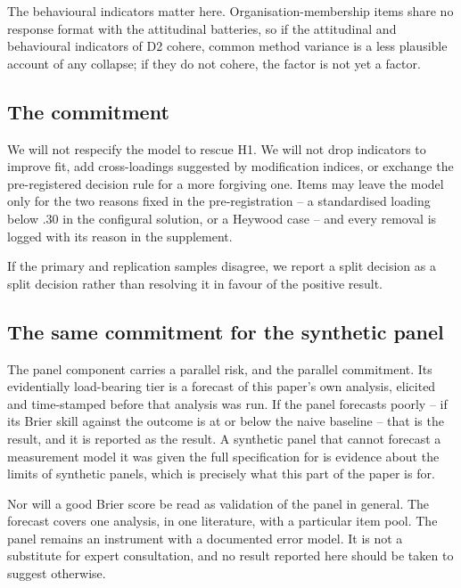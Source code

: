 The behavioural indicators matter here. Organisation-membership items share no
response format with the attitudinal batteries, so if the attitudinal and
behavioural indicators of D2 cohere, common method variance is a less plausible
account of any collapse; if they do not cohere, the factor is not yet a factor.

\subsection{The commitment}

We will not respecify the model to rescue H1. We will not drop indicators to
improve fit, add cross-loadings suggested by modification indices, or exchange
the pre-registered decision rule for a more forgiving one. Items may leave the
model only for the two reasons fixed in the pre-registration -- a standardised
loading below $.30$ in the configural solution, or a Heywood case -- and every
removal is logged with its reason in the supplement.

If the primary and replication samples disagree, we report a split decision as
a split decision rather than resolving it in favour of the positive result.

\subsection{The same commitment for the synthetic panel}

The panel component carries a parallel risk, and the parallel commitment. Its
evidentially load-bearing tier is a forecast of this paper's own analysis,
elicited and time-stamped before that analysis was run. If the panel forecasts
poorly -- if its Brier skill against the outcome is at or below the naive
baseline -- that is the result, and it is reported as the result. A synthetic
panel that cannot forecast a measurement model it was given the full
specification for is evidence about the limits of synthetic panels, which is
precisely what this part of the paper is for.

Nor will a good Brier score be read as validation of the panel in general. The
forecast covers one analysis, in one literature, with a particular item pool.
The panel remains an instrument with a documented error model. It is not a
substitute for expert consultation, and no result reported here should be taken
to suggest otherwise.
